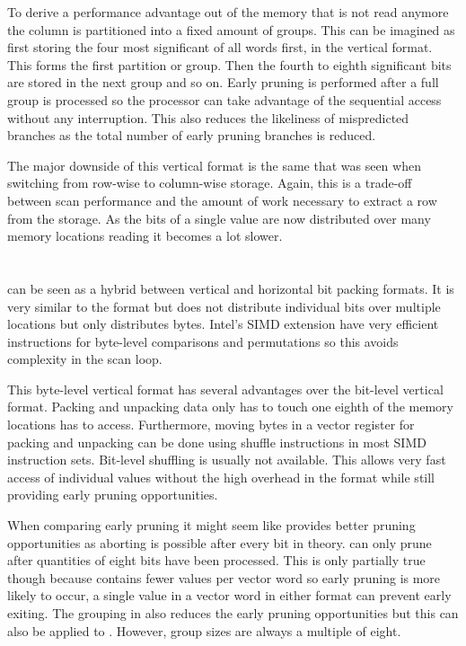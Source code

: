 To derive a performance advantage out of the memory that is not read anymore the
column is partitioned into a fixed amount of groups. This can be imagined as
first storing the four most significant of all words first, in the vertical
format. This forms the first partition or group. Then the fourth to eighth
significant bits are stored in the next group and so on. Early pruning is
performed after a full group is processed so the processor can take advantage of
the sequential access without any interruption. This also reduces the likeliness
of mispredicted branches as the total number of early pruning branches is
reduced.

The major downside of this vertical format is the same that was seen when
switching from row-wise to column-wise storage. Again, this is a trade-off
between scan performance and the amount of work necessary to extract a row from
the storage. As the bits of a single value are now distributed over many memory
locations reading it becomes a lot slower.

\section{\bs{}}

\bs{} \cite{ByteSlice} can be seen as a hybrid between vertical and horizontal
bit packing formats. It is very similar to the \bwv{} format but does not
distribute individual bits over multiple locations but only distributes bytes.
Intel's SIMD extension have very efficient instructions for byte-level
comparisons and permutations so this avoids complexity in the scan loop.

This byte-level vertical format has several advantages over the bit-level
vertical format. Packing and unpacking \bs{} data only has to touch one eighth
of the memory locations \bwv{} has to access. Furthermore, moving bytes in a
vector register for packing and unpacking can be done using shuffle instructions
in most SIMD instruction sets. Bit-level shuffling is usually not available.
This allows very fast access of individual values without the high overhead in
the \bwv{} format while still providing early pruning opportunities.

When comparing early pruning it might seem like \bwv{} provides better pruning
opportunities as aborting is possible after every bit in theory. \bs{} can only
prune after quantities of eight bits have been processed. This is only partially
true though because \bs{} contains fewer values per vector word so early pruning
is more likely to occur, a single value in a vector word in either format can
prevent early exiting. The grouping in \bwv{} also reduces the early pruning
opportunities but this can also be applied to \bs{}. However, \bs{} group sizes
are always a multiple of eight.

